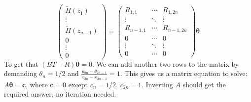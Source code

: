 \documentclass{article}
\newcommand{\bs}{\boldsymbol}                               %
\begin{document}
\[ \left( \begin{array}{c} \tilde{\Pi}(z_1) \\ \vdots \\ \tilde{\Pi}(z_{n-1}) 
\\[4pt] 0 \\ \vdots \\ 0 \end{array} \right) =
\left( \begin{array}{ccc} R_{1,1} & \cdots & R_{1 , 2n} \\
\vdots & \ddots & \vdots \\ R_{n-1,1} & \cdots & R_{n-1 , 2n} 
\\ 0 & \cdots & 0  \\
\vdots & \ddots & \vdots \\ 0 & \cdots & 0 
\end{array} \right) \bs{\theta} \]
To get that $(BT-R)\bs{\theta} = 0$. We can add another two rows to the
matrix by demanding $\theta_n=1/2$ and 
$\displaystyle \frac{\theta_{2n}-\theta_{2n-1}}{x_{2n}- x_{2n-1}}=1$.
This gives us a matrix equation to solve: $A \bs{\theta} = \bs{c}$, where
$\bs{c}=0$ except $c_n=1/2$, $c_{2n}=1$. Inverting $A$ should get the 
required answer, no iteration needed.
\end{document}
